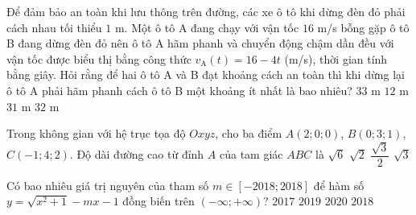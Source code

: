 \begin{ex}%
Để đảm bảo an toàn khi lưu thông trên đường, các xe ô tô khi dừng đèn đỏ phải cách nhau tối thiểu $1$ m. Một ô tô A đang chạy với vận tốc $16$ m/s bỗng gặp ô tô B đang dừng đèn đỏ nên ô tô A hãm phanh và chuyển động chậm dần đều với vận tốc được biểu thị bằng công thức $v_{\text{A}}(t)=16-4t$ (m/s), thời gian tính bằng giây. Hỏi rằng để hai ô tô A và B đạt khoảng cách an toàn thì khi dừng lại ô tô A phải hãm phanh cách ô tô B một khoảng ít nhất là bao nhiêu?
\choice
{\True $33$ m}
{$12$ m}
{$31$ m}
{$32$ m}
\end{ex}

\begin{ex}%
Trong không gian với hệ trục tọa độ $Oxyz$, cho ba điểm $A(2;0;0)$, $B(0;3;1)$, $C(-1;4;2)$. Độ dài đường cao từ đỉnh $A$ của tam giác $ABC$ là
\choice
{$\sqrt{6}$}
{\True $\sqrt{2}$}
{$\dfrac{\sqrt{3}}{2}$}
{$\sqrt{3}$}
\end{ex}

\begin{ex}%
Có bao nhiêu giá trị nguyên của tham số $m\in [-2018;2018]$ để hàm số $y=\sqrt{x^2+1}-mx-1$ đồng biến trên $(-\infty;+\infty)$?
\choice
{$2017$}
{$2019$}
{$2020$}
{\True $2018$}
\end{ex}

